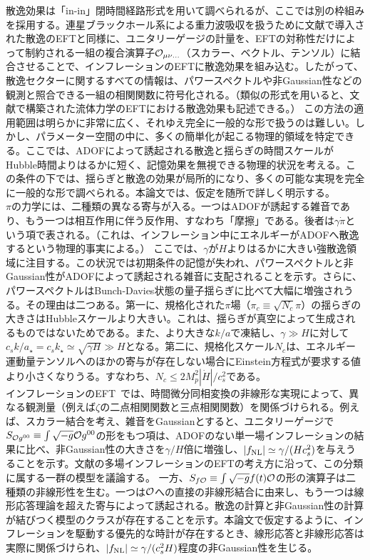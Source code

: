 散逸効果は「in-in」閉時間経路形式\cite{calzetta}を用いて調べられるが、ここでは別の枠組みを採用する。連星ブラックホール系による重力波吸収を扱うために文献\cite{dis1,dis2}で導入された散逸のEFTと同様に、ユニタリーゲージの計量を、EFTの対称性だけによって制約される一組の複合演算子$\cal O_{\mu\nu\ldots}$（スカラー、ベクトル、テンソル）に結合させることで、インフレーションのEFTに散逸効果を組み込む。したがって、散逸セクターに関するすべての情報は、パワースペクトルや非Gaussian性などの観測と照合できる一組の相関関数に符号化される。（類似の形式\cite{hydro}を用いると、文献\cite{efthydro}で構築された流体力学のEFTにおける散逸効果も記述できる。）
この方法の適用範囲は明らかに非常に広く、それゆえ完全に一般的な形で扱うのは難しい。しかし、パラメーター空間の中に、多くの簡単化が起こる物理的領域を特定できる。ここでは、ADOFによって誘起される散逸と揺らぎの時間スケールがHubble時間よりはるかに短く、記憶効果を無視できる物理的状況を考える。この条件の下では、揺らぎと散逸の効果が局所的になり、多くの可能な実現を完全に一般的な形で調べられる。本論文では、仮定を随所で詳しく明示する。\\

$\pi$の力学には、二種類の異なる寄与が入る。一つはADOFが誘起する雑音であり、もう一つは相互作用に伴う反作用、すなわち「摩擦」である。後者は$\gamma\dot\pi$という項で表される。（これは、インフレーション中にエネルギーがADOFへ散逸するという物理的事実による。）
ここでは、$\gamma$が$H$よりはるかに大きい強散逸領域に注目する。この状況では初期条件の記憶が失われ、パワースペクトルと非Gaussian性がADOFによって誘起される雑音に支配されることを示す。さらに、パワースペクトルはBunch-Davies状態の量子揺らぎに比べて大幅に増強されうる。その理由は二つある。第一に、規格化された$\pi$場（$\pi_c \equiv \sqrt{N_c}\pi$）の揺らぎの大きさはHubbleスケールより大きい。これは、揺らぎが真空によって生成されるものではないためである。また、より大きな$k/a$で凍結し、$\gamma \gg H$に対して$c_s k/a_\star = c_s k_\star \simeq \sqrt{\gamma H} \gg H$となる。第二に、規格化スケール$N_c$は、エネルギー運動量テンソルへのほかの寄与が存在しない場合にEinstein方程式が要求する値より小さくなりうる。すなわち、$N_c \leq 2 M_p^2|\dot H|/c_s^2$である。\\

インフレーションのEFT~\cite{eft1}では、時間微分同相変換の非線形な実現によって、異なる観測量（例えば$\zeta$の二点相関関数と三点相関関数）を関係づけられる。例えば、スカラー結合を考え、雑音をGaussianとすると、ユニタリーゲージで$S_{{\cal O} g^{00}} \equiv \int \sqrt{-g}{\cal O} g^{00}$の形をもつ項は、ADOFのない単一場インフレーションの結果\cite{eft1}に比べ、非Gaussian性の大きさを$\gamma/H$倍に増強し、$|f_{\rm NL}| \simeq \gamma/(Hc_s^2)$を与えうることを示す。文献\cite{multieft}の多場インフレーションのEFTの考え方に沿って、この分類に属する一群の模型を議論する。
一方、$S_{f{\cal O}}\equiv \int \sqrt{-g} f(t){\cal O}$の形の演算子は二種類の非線形性を生む。一つは${\cal O}$への直接の非線形結合に由来し、もう一つは線形応答理論を超えた寄与によって誘起される。散逸の計算と非Gaussian性の計算が結びつく模型のクラスが存在することを示す。本論文で仮定するように、インフレーションを駆動する優先的な時計が存在するとき、線形応答と非線形応答は実際に関係づけられ、$|f_{\rm NL}| \simeq \gamma/(c_s^2H)$程度の非Gaussian性を生じる。

